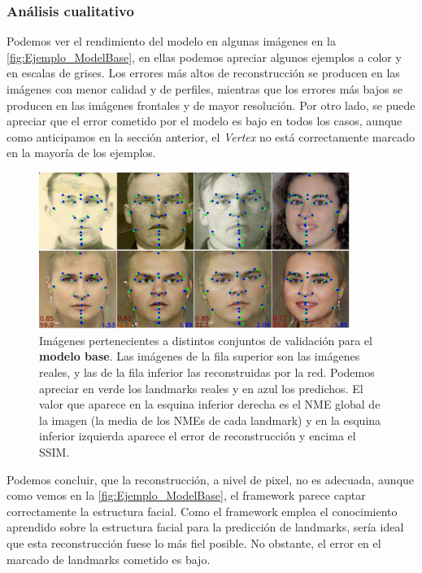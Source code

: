         
        \subsubsection*{Análisis cualitativo}
        
        \medskip Podemos ver el rendimiento del modelo en algunas imágenes en la \autoref{fig:Ejemplo_ModelBase}, en ellas podemos apreciar algunos ejemplos a color y en escalas de grises. Los errores más altos de reconstrucción se producen en las imágenes con menor calidad y de perfiles, mientras que los errores más bajos se producen en las imágenes frontales y de mayor resolución. Por otro lado, se puede apreciar que el error cometido por el modelo es bajo en todos los casos, aunque como anticipamos en la sección anterior, el \textit{Vertex} no está correctamente marcado en la mayoría de los ejemplos.

        \begin{figure}[H]
            \centering
            \includegraphics[width=0.9\textwidth]{img/image_basemodel.png}
            \caption{Imágenes pertenecientes a distintos conjuntos de validación para el \textbf{modelo base}. Las imágenes de la fila superior son las imágenes reales, y las de la fila inferior las reconstruidas por la red. Podemos apreciar en verde los landmarks reales y  en azul los predichos. El valor que aparece en la esquina inferior derecha es el NME global de la imagen (la media de los NMEs de cada landmark) y en la esquina inferior izquierda aparece el error de reconstrucción y encima el SSIM.}
            \label{fig:Ejemplo_ModelBase}
        \end{figure}

        \noindent Podemos concluir, que la reconstrucción, a nivel de pixel, no es adecuada, aunque como vemos en la \autoref{fig:Ejemplo_ModelBase}, el framework parece captar correctamente la estructura facial. Como el framework emplea el conocimiento aprendido sobre la estructura facial para la predicción de landmarks, sería ideal que esta reconstrucción fuese lo más fiel posible. No obstante, el error en el marcado de landmarks cometido es bajo.

